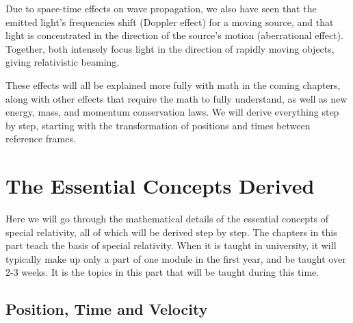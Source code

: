 Due to space-time effects on wave propagation, we also have seen that the emitted light's frequencies shift (Doppler effect) for a moving source, and that light is concentrated in the direction of the source's motion (aberrational effect).
Together, both intensely focus light in the direction of rapidly moving objects, giving relativistic beaming.

These effects will all be explained more fully with math in the coming chapters, along with other effects that require the math to fully understand, as well as new energy, mass, and momentum conservation laws.
We will derive everything step by step, starting with the transformation of positions and times between reference frames.




\printbibliography[segment=\therefsegment, heading=subbibliography] %

\part{The Essential Concepts Derived} %

Here we will go through the mathematical details of the essential concepts of special relativity, all of which will be derived step by step.
The chapters in this part teach the basis of special relativity.
When it is taught in university, it will typically make up only a part of one module in the first year, and be taught over 2-3 weeks.
It is the topics in this part that will be taught during this time.

\chapter{Position, Time and Velocity} \label{ch: Position, Time and Velocity} %

